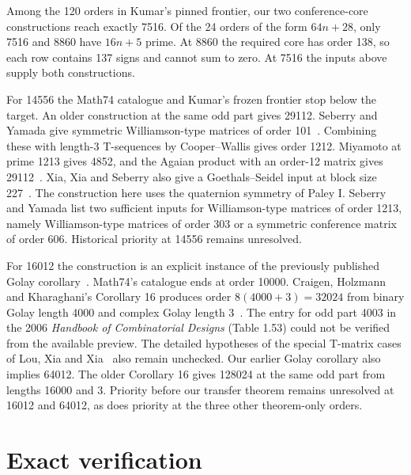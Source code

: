 \documentclass[10pt]{article}
\begin{document}
Among the 120 orders in Kumar's pinned frontier, our two conference-core constructions reach exactly 7516. Of the 24 orders of the form $64n+28$, only 7516 and 8860 have $16n+5$ prime. At 8860 the required core has order 138, so each row contains 137 signs and cannot sum to zero. At 7516 the inputs above supply both constructions.

For 14556 the Math74 catalogue and Kumar's frozen frontier stop below the target. An older construction at the same odd part gives 29112. Seberry and Yamada give symmetric Williamson-type matrices of order 101~\cite[Corollary~29 and Remark~30]{sy90}. Combining these with length-3 T-sequences by Cooper--Wallis gives order 1212. Miyamoto at prime 1213 gives 4852, and the Agaian product with an order-12 matrix gives 29112~\cite{mathrules}. Xia, Xia and Seberry also give a Goethals--Seidel input at block size 227~\cite{xxs}. The construction here uses the quaternion symmetry of Paley I. Seberry and Yamada list two sufficient inputs for Williamson-type matrices of order 1213, namely Williamson-type matrices of order 303 or a symmetric conference matrix of order 606. Historical priority at 14556 remains unresolved.

For 16012 the construction is an explicit instance of the previously published Golay corollary~\cite{transfer}. Math74's catalogue ends at order 10000. Craigen, Holzmann and Kharaghani's Corollary 16 produces order $8(4000+3)=32024$ from binary Golay length 4000 and complex Golay length 3~\cite{chk}. The entry for odd part 4003 in the 2006 \emph{Handbook of Combinatorial Designs} (Table 1.53) could not be verified from the available preview. The detailed hypotheses of the special T-matrix cases of Lou, Xia and Xia~\cite{lou} also remain unchecked. Our earlier Golay corollary also implies 64012. The older Corollary 16 gives 128024 at the same odd part from lengths 16000 and 3. Priority before our transfer theorem remains unresolved at 16012 and 64012, as does priority at the three other theorem-only orders.

\section{Exact verification}
\end{document}
